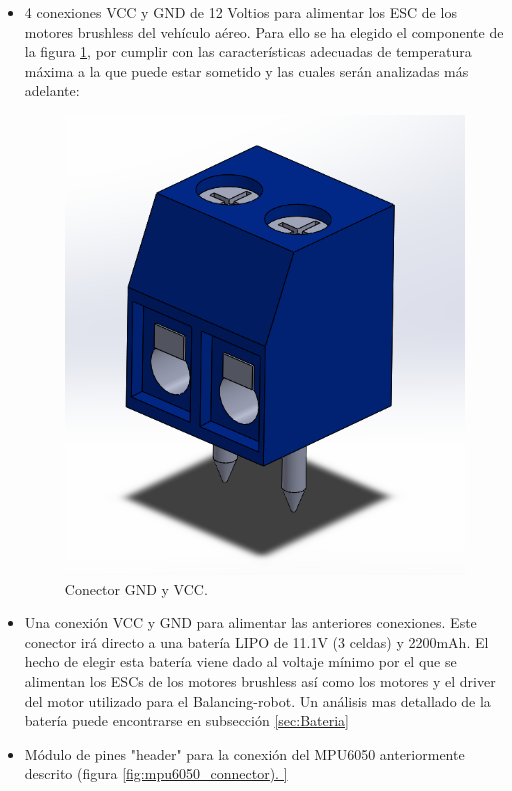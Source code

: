 \begin{itemize}
	
	\item 4 conexiones VCC y GND de 12 Voltios para alimentar los ESC de los motores brushless del vehículo aéreo. Para ello se ha elegido el componente de la figura \ref{fig:screw}, por cumplir con las características adecuadas de temperatura máxima a la que puede estar sometido y las cuales serán analizadas más adelante: 
	
	\begin{figure}[H]
		\center
		\includegraphics[scale=0.5]{imagenes/Balancing_robot/SCREW.PNG}
		\caption{Conector GND y VCC.}
		\label{fig:screw}
	\end{figure}
	
	
	\item Una conexión VCC y GND para alimentar las anteriores conexiones. Este conector irá directo a una batería LIPO de 11.1V (3 celdas) y 2200mAh. El hecho de elegir esta batería viene dado al voltaje mínimo por el que se alimentan los ESCs de los motores brushless así como los motores y el driver del motor utilizado para el Balancing-robot. Un análisis mas detallado de la batería puede encontrarse en subsección \ref{sec:Bateria}
	
	\item Módulo de pines "header" para la conexión del MPU6050 anteriormente descrito (figura \ref{fig:mpu6050_connector).
		
}
\end{itemize}

